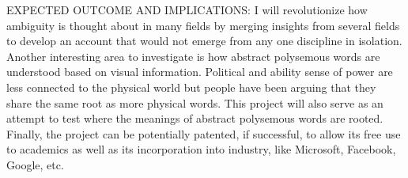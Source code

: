 \documentclass[letterpaper, 12pt]{article}
\begin{document}
EXPECTED OUTCOME AND IMPLICATIONS: I will revolutionize how ambiguity is thought about in many fields by merging insights from several fields to develop an account that would not emerge from any one discipline in isolation. Another interesting area to investigate is how abstract polysemous words are understood based on visual information. Political and ability sense of power are less connected to the physical world but people have been arguing that they share the same root as more physical words. This project will also serve as an attempt to test where the meanings of abstract polysemous words are rooted. Finally, the project can be potentially patented, if successful, to allow its free use to academics as well as its incorporation into industry, like Microsoft, Facebook, Google, etc.


\newpage
% 

\end{document}
